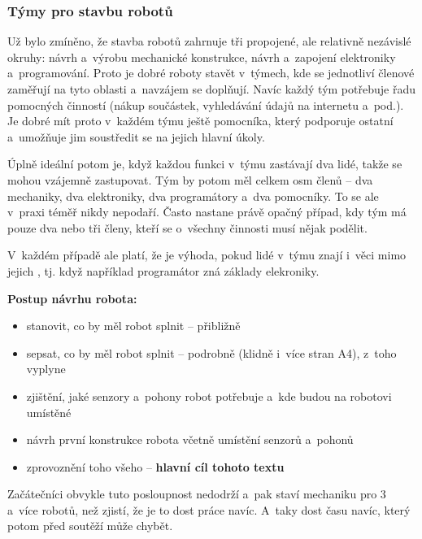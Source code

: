 \subsubsection{Týmy pro stavbu robotů}

Už bylo zmíněno, že stavba robotů zahrnuje tři propojené, ale relativně nezávislé okruhy: návrh a~výrobu mechanické konstrukce, návrh a~zapojení elektroniky a~programování. 
Proto je dobré roboty stavět v~týmech, kde se jednotliví členové zaměřují na tyto oblasti a~navzájem se doplňují. Navíc každý tým potřebuje řadu pomocných činností (nákup součástek, vyhledávání údajů na internetu a~pod.). Je dobré mít proto v~každém týmu ještě pomocníka, který podporuje ostatní a~umožňuje jim soustředit se na jejich hlavní úkoly. 

Úplně ideální potom je, když každou funkci v~týmu zastávají dva lidé, takže se mohou vzájemně zastupovat. Tým by potom měl celkem osm členů -- dva mechaniky, dva elektroniky, dva programátory a~dva pomocníky. To se ale v~praxi téměř nikdy nepodaří. Často nastane právě opačný případ, kdy tým má pouze dva nebo tři členy, kteří se o~všechny činnosti musí nějak podělit. 

V~každém případě ale platí, že je výhoda, pokud lidé v~týmu znají i~věci mimo jejich , tj. když například programátor zná základy elekroniky.    


{\bf Postup návrhu robota: }
\begin{itemize} %
\item  stanovit, co by měl robot splnit -- přibližně 
\item  sepsat, co by měl robot splnit -- podrobně (klidně i~více stran A4), z~toho vyplyne
\item  zjištění, jaké senzory a~pohony robot potřebuje a~kde budou na robotovi umístěné
\item  návrh první konstrukce robota včetně umístění senzorů a~pohonů
\item  zprovoznění toho všeho -- {\bf hlavní cíl tohoto textu }
\end{itemize}

Začátečníci obvykle tuto posloupnost nedodrží a~pak staví mechaniku pro 3 a~více robotů,
 než zjistí, že je to dost práce navíc. A~taky dost času navíc, který potom před soutěží může chybět. 






